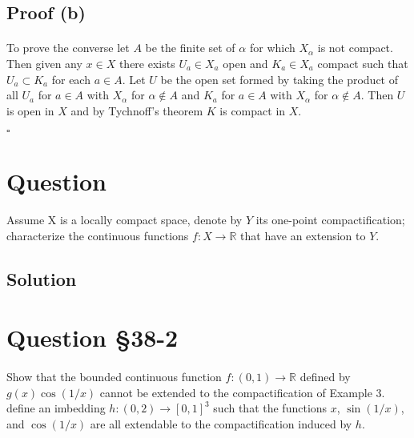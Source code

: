 \documentclass[11pt, oneside]{article}   	%
\newcommand{\R}{\mathbb{R}}
\newcommand{\qed}{\begin{center}
$\square$
\end{center}}
\begin{document}
\subsection*{Proof (b)}
\paragraph{}

To prove the converse let $A$ be the finite set of $\alpha$ for which $X_\alpha$ is not compact. Then given any $x \in X$ there exists $U_a \in X_a$ open and $K_a \in X_a$ compact such that $U_a \subset K_a$ for each $a \in A$. Let $U$ be the open set formed by taking the product of all $U_a$ for $a \in A$ with $X_\alpha$ for $\alpha \not \in A$ and $K_a$ for $a \in A$ with $X_\alpha$ for $\alpha \not \in A$. Then $U$ is open in $X$ and by Tychnoff's theorem $K$ is compact in $X$. \qed

 
\section*{Question}
\paragraph{}

Assume X is a locally compact space, denote by $Y$ its one-point compactification; characterize the continuous functions $f:X \to \R$ that have an extension to $Y$.

\subsection*{Solution}
\paragraph{}



\section*{Question \S38-2}
\paragraph{}

Show that the bounded continuous function $f:(0,1) \to \R$ defined by $g(x) \cos(1/x)$ cannot be extended to the compactification of Example 3. define an imbedding $h: (0,2) \to [0,1]^3$ such that the functions $x$, $\sin(1/x)$, and $\cos(1/x)$ are all extendable to the compactification induced by $h$.
\end{document}
